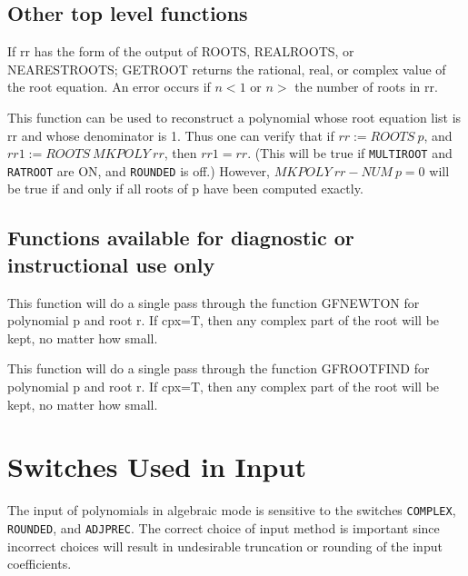\subsection{Other top level functions}

\begin{description}
   
\item[GETROOT(n,rr);] If rr has the form of the output of ROOTS, REALROOTS,
or NEARESTROOTS; GETROOT returns the rational, real, or complex value of
the root equation.  An error occurs if $n<1$ or $n>$ the number of roots in
rr.

\item[MKPOLY rr;] This function can be used to reconstruct a polynomial
whose root equation list is rr and whose denominator is 1.  Thus one can
verify that if $rr := ROOTS~p$, and $rr1 := ROOTS~MKPOLY~rr$, then
$rr1 = rr$. (This will be true if {\tt MULTIROOT} and {\tt RATROOT} are ON,
and {\tt ROUNDED} is off.)
However, $MKPOLY~rr - NUM~p = 0$ will be true if and only if all roots of p
have been computed exactly.

\end{description}

\subsection{Functions available for diagnostic or instructional use only}

\begin{description}
\item[GFNEWT(p,r,cpx);] This function will do a single pass through the
function GFNEWTON for polynomial p and root r.  If cpx=T, then any
complex part of the root will be kept, no matter how small.

\item[GFROOT(p,r,cpx);] This function will do a single pass through the
function GFROOTFIND for polynomial p and root r.  If cpx=T, then any
complex part of the root will be kept, no matter how small.
\end{description}
\section{Switches Used in Input}

The input of polynomials in algebraic mode is sensitive to the switches
{\tt COMPLEX}, {\tt ROUNDED}, and {\tt ADJPREC}.  The correct choice of
input method is important since incorrect choices will result in
undesirable truncation or rounding of the input coefficients.


